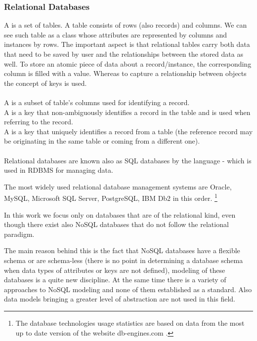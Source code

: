 \subsubsection{Relational Databases}
\label{relational_databases}
A  is a set of tables. A table consists of rows (also records) and columns. We can see such table as a class whose attributes are represented by columns and instances by rows.
The important aspect is that relational tables carry both data that need to be saved by user and the relationships between the stored data as well. 
To store an atomic piece of data about a record/instance, the corresponding column is filled with a value.
Whereas to capture a relationship between objects the concept of keys is used. \\ \\
A  is a subset of table's columns used for identifying a record. \\
A  is a key that non-ambiguously identifies a record in the table and is used when referring to the record. \\
A  is a key that uniquely identifies a record from a table (the reference record may be originating in the same table or coming from a different one). \\ \\
Relational databases are known also as SQL databases by the language -  which is used in RDBMS for managing data.

The most widely used relational database management systems are Oracle, MySQL, Microsoft SQL Server, PostgreSQL, IBM Db2 in this order. \footnote{The database technologies usage statistics are based on data from the most up to date version of the website db-engines.com \cite{DatabaseEnginesStatistics19}.}

In this work we focus only on databases that are of the relational kind, even though there exist also NoSQL databases that do not follow the relational paradigm. 

The main reason behind this is the fact that NoSQL databases have a flexible schema or are schema-less (there is no point in determining a database schema when data types of attributes or keys are not defined), modeling of these databases is a quite new discipline. At the same time there is a variety of approaches to NoSQL modeling and none of them established as a standard.
Also data models bringing a greater level of abstraction are not used in this field. \cite{NoSQLDatabaseModeling}

